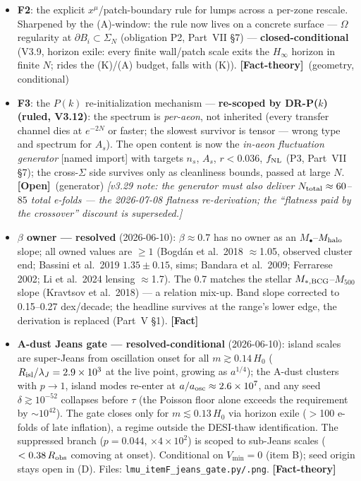 \documentclass[11pt]{article}
\newcommand{\fact}{\textcolor{green!40!black}{\textbf{[Fact]}}}
\newcommand{\factth}{\textcolor{green!40!black}{\textbf{[Fact-theory]}}}
\newcommand{\open}{\textcolor{red!70!black}{\textbf{[Open]}}}
\begin{document}
\begin{itemize}[leftmargin=2.6em,itemsep=3pt]
\item[\textbf{(C)}] \textbf{F2}: the explicit $x^\mu$/patch-boundary rule for lumps across a per-zone rescale. Sharpened by the (A)-window: the rule now lives on a concrete surface --- $\Omega$ regularity at $\partial B_i\subset\Sigma_N$ (obligation P2, Part~VII \S7) --- \textbf{closed-conditional} (V3.9, horizon exile: every finite wall/patch scale exits the $H_\infty$ horizon in finite $N$; rides the (K)/(A) budget, falls with (K)). \factth\ (geometry, conditional)
\item[\textbf{(D)}] \textbf{F3}: the $P(k)$ re-initialization mechanism --- \textbf{re-scoped by DR-P($k$) (ruled, V3.12)}: the spectrum is \emph{per-aeon}, not inherited (every transfer channel dies at $e^{-2N}$ or faster; the slowest survivor is tensor --- wrong type and spectrum for $A_s$). The open content is now the \emph{in-aeon fluctuation generator} [named import] with targets $n_s$, $A_s$, $r<0.036$, $f_{\rm NL}$ (P3, Part~VII \S7); the cross-$\Sigma$ side survives only as cleanliness bounds, passed at large $N$. \open\ (generator) \emph{[v3.29 note: the generator must also deliver $N_{\rm total}\approx60$--$85$ total e-folds --- the 2026-07-08 flatness re-derivation; the ``flatness paid by the crossover'' discount is superseded.]}
\item[\textbf{(E)}] \textbf{$\beta$ owner --- resolved} (2026-06-10): $\beta\approx0.7$ has no owner as an $M_\bullet$--$M_{\rm halo}$ slope; all owned values are $\ge1$ (Bogd\'an et al.\ 2018 $\approx$1.05, observed cluster end; Bassini et al.\ 2019 $1.35\pm0.15$, sims; Bandara et al.\ 2009; Ferrarese 2002; Li et al.\ 2024 lensing $\approx$1.7). The 0.7 matches the stellar $M_{*,\rm BCG}$--$M_{500}$ slope (Kravtsov et al.\ 2018) --- a relation mix-up. Band slope corrected to 0.15--0.27 dex/decade; the headline survives at the range's lower edge, the derivation is replaced (Part~V \S1). \fact
\item[\textbf{(F)}] \textbf{A-dust Jeans gate --- resolved-conditional} (2026-06-10): island scales are super-Jeans from oscillation onset for all $m\gtrsim0.14\,H_0$ ($R_{\rm isl}/\lambda_J=2.9\times10^3$ at the live point, growing as $a^{1/4}$); the A-dust clusters with $p\to1$, island modes re-enter at $a/a_{\rm osc}\approx2.6\times10^7$, and any seed $\delta\gtrsim10^{-52}$ collapses before $\tau$ (the Poisson floor alone exceeds the requirement by $\sim\!10^{42}$). The gate closes only for $m\lesssim0.13\,H_0$ via horizon exile ($>$100 e-folds of late inflation), a regime outside the DESI-thaw identification. The suppressed branch ($p=0.044$, $\times4\times10^2$) is scoped to sub-Jeans scales ($<0.38\,R_{\rm obs}$ comoving at onset). Conditional on $V_{\min}=0$ (item B); seed origin stays open in (D). Files: \texttt{lmu\_itemF\_jeans\_gate.py/.png}. \factth

\end{itemize}
\end{document}
